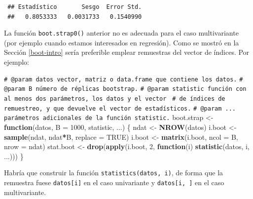 \documentclass[
  spanish,
  10pt,
]{book}
\newenvironment{Shaded}{\begin{snugshade}}{\end{snugshade}}
\newcommand{\AttributeTok}[1]{\textcolor[rgb]{0.13,0.29,0.53}{#1}}
\newcommand{\CommentTok}[1]{\textcolor[rgb]{0.56,0.35,0.01}{\textit{#1}}}
\newcommand{\ConstantTok}[1]{\textcolor[rgb]{0.56,0.35,0.01}{#1}}
\newcommand{\ControlFlowTok}[1]{\textcolor[rgb]{0.13,0.29,0.53}{\textbf{#1}}}
\newcommand{\DecValTok}[1]{\textcolor[rgb]{0.00,0.00,0.81}{#1}}
\newcommand{\FunctionTok}[1]{\textcolor[rgb]{0.13,0.29,0.53}{\textbf{#1}}}
\newcommand{\NormalTok}[1]{#1}
\newcommand{\OtherTok}[1]{\textcolor[rgb]{0.56,0.35,0.01}{#1}}
\newcommand{\SpecialCharTok}[1]{\textcolor[rgb]{0.81,0.36,0.00}{\textbf{#1}}}
\theoremstyle{break}
\theoremstyle{nonumberplain}
\renewcommand{\CommentTok}[1]{\textcolor[rgb]{0.41,0.41,0.41}{\texttt{#1}}}
\begin{document}
\begin{verbatim}
 ## Estadístico       Sesgo  Error Std. 
 ##   0.8053333   0.0031733   0.1540990
\end{verbatim}

La función \texttt{boot.strap0()} anterior no es adecuada para el caso multivariante (por ejemplo cuando estamos interesados en regresión).
Como se mostró en la Sección \ref{boot-intro} sería preferible emplear remuestras del vector de índices. Por ejemplo:

\begin{Shaded}
\begin{Highlighting}[]
\CommentTok{\#\textquotesingle{} @param datos vector, matriz o data.frame que contiene los datos.}
\CommentTok{\#\textquotesingle{} @param B número de réplicas bootstrap.}
\CommentTok{\#\textquotesingle{} @param statistic función con al menos dos parámetros, los datos y el vector }
\CommentTok{\#\textquotesingle{}        de índices de remuestreo, y que devuelve el vector de estadísticos.}
\CommentTok{\#\textquotesingle{} @param ... parámetros adicionales de la función statistic.}
\NormalTok{boot.strap }\OtherTok{\textless{}{-}} \ControlFlowTok{function}\NormalTok{(datos, }\AttributeTok{B =} \DecValTok{1000}\NormalTok{, statistic, ...) \{}
\NormalTok{  ndat }\OtherTok{\textless{}{-}} \FunctionTok{NROW}\NormalTok{(datos)}
\NormalTok{  i.boot }\OtherTok{\textless{}{-}} \FunctionTok{sample}\NormalTok{(ndat, ndat}\SpecialCharTok{*}\NormalTok{B, }\AttributeTok{replace =} \ConstantTok{TRUE}\NormalTok{)}
\NormalTok{  i.boot }\OtherTok{\textless{}{-}} \FunctionTok{matrix}\NormalTok{(i.boot, }\AttributeTok{ncol =}\NormalTok{ B, }\AttributeTok{nrow =}\NormalTok{ ndat)}
\NormalTok{  stat.boot }\OtherTok{\textless{}{-}} \FunctionTok{drop}\NormalTok{(}\FunctionTok{apply}\NormalTok{(i.boot, }\DecValTok{2}\NormalTok{, }\ControlFlowTok{function}\NormalTok{(i) }\FunctionTok{statistic}\NormalTok{(datos, i, ...)))}
\NormalTok{\}}
\end{Highlighting}
\end{Shaded}

Habría que construir la función \texttt{statistics(datos,\ i)}, de forma que la remuestra fuese \texttt{datos{[}i{]}} en el caso univariante y \texttt{datos{[}i,\ {]}} en el caso multivariante.
\end{document}
